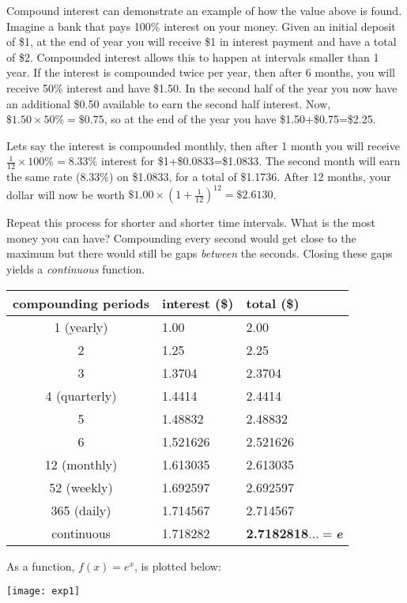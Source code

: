 Compound interest can demonstrate an example of  how the value above is found. Imagine a bank that pays 100\% interest on your money. Given an initial deposit of \$1, at the end of year you will receive \$1 in interest payment and have a total of \$2. Compounded interest allows this to happen at intervals smaller than 1 year. If the interest is compounded twice per year, then after 6 months, you will receive 50\% interest and have \$1.50. In the second half of the year you now have an additional \$0.50 available to earn the second half interest. Now, $\$1.50\times50\%=\$0.75$, so at the end of the year you have \$1.50+\$0.75=\$2.25.

Lets say the interest is compounded monthly, then after 1 month you will receive $\frac{1}{12}\times 100\%=8.33\%$ interest for \$1+\$0.0833=\$1.0833. The second month will earn the same rate (8.33\%) on \$1.0833, for a total of \$1.1736. After 12 months, your dollar will now be worth $\$1.00\times\left(1+\frac{1}{12}\right)^{12}=\$2.6130$. 

Repeat this process for shorter and shorter time intervals. What is the most money you can have? Compounding every second would get close to the maximum but there would still be gaps \textit{between} the seconds. Closing these gaps yields a \textit{continuous} function.
\begin{center}
\begin{tabular}{cll}
	\toprule
	compounding periods&interest (\$)&total (\$)\\
	\midrule
	1 (yearly)&1.00&2.00\\
	2&1.25&2.25\\
	3&1.3704 &2.3704\\
	4 (quarterly)& 1.4414 & 2.4414 \\
	5& 1.48832 & 2.48832 \\
	6& 1.521626&2.521626\\\midrule
	12 (monthly)& 1.613035&2.613035 \\\midrule
	52 (weekly)&1.692597 &2.692597\\\midrule
	365 (daily)&1.714567 &2.714567\\\midrule
	continuous& 1.718282&\textbf{2.7182818}$...=$\textit{\textbf{e}}\\
	\bottomrule
\end{tabular}
\end{center}

As a function, $f(x)=e^x$, is plotted below:
\begin{center}
	\texttt{[image: exp1]}
\end{center}
